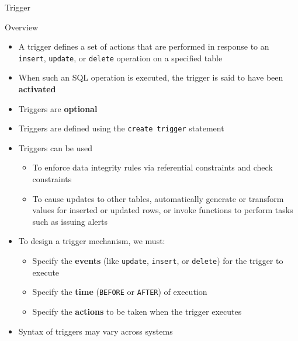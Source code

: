 \documentclass[aspectratio=169, xcolor=dvipsnames]{beamer}
\begin{document}
\begin{frame}{Trigger}
    \begin{block}{Overview}
        \begin{itemize}[<+->]
            \item A trigger defines a set of actions that are performed in response to an \texttt{insert}, \texttt{update}, or \texttt{delete} operation on a specified table
            \item When such an SQL operation is executed, the trigger is said to have been \textbf{activated}
            \item Triggers are \textbf{optional}
            \item Triggers are defined using the \texttt{create trigger} statement
            \item Triggers can be used
            \begin{itemize}
                \item[$\triangleright$] To enforce data integrity rules via referential constraints and check constraints
                \item[$\triangleright$] To cause updates to other tables, automatically generate or transform values for inserted or updated rows, or invoke functions to perform tasks such as issuing alerts
            \end{itemize}
            \item To design a trigger mechanism, we must:
            \begin{itemize}
                \item[$\triangleright$] Specify the \textbf{events} (like \texttt{update}, \texttt{insert}, or \texttt{delete}) for the trigger to execute
                \item[$\triangleright$] Specify the \textbf{time} (\texttt{BEFORE} or \texttt{AFTER}) of execution
                \item[$\triangleright$] Specify the \textbf{actions} to be taken when the trigger executes
            \end{itemize}
            \item Syntax of triggers may vary across systems
        \end{itemize}
    \end{block}
\end{frame}
\end{document}
